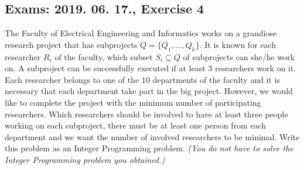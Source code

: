 \subsection {Exams: 2019. 06. 17., Exercise 4}


The Faculty of Electrical Engineering and Informatics works on a grandiose research
project that has subprojects $Q = \{Q_1, \dots{}, Q_k\}$. It is known for each researcher $R_i$
of the faculty, which subset $S_i \subseteq{} Q$ of subprojects can she/he work on. A subproject
can be successfully executed if at least $3$ researchers work on it. Each researcher
belongs to one of the $10$ departments of the faculty and it is necessary that each
department take part in the big project. However, we would like to complete the
project with the minimum number of participating researchers. Which researchers
should be involved to have at least three people working on each subproject, there
must be at least one person from each department and we want the number of
involved researchers to be minimal. Write this problem as an Integer Programming
problem. \textit{(You do not have to solve the Integer Programming problem you obtained.)}



